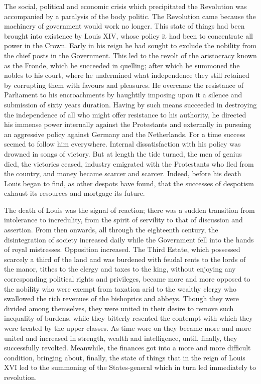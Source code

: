 \documentclass{book}
\begin{document}
The social, political and economic crisis which precipitated the Revolution was accompanied by a paralysis of the body politic. The Revolution came because the machinery of government would work no longer. This state of things had been brought into existence by Louis XIV, whose policy it had been to concentrate all power in the Crown. Early in his reign he had sought to exclude the nobility from the chief posts in the Government. This led to the revolt of the aristocracy known as the Fronde, which he succeeded in quelling; after which he summoned the nobles to his court, where he undermined what independence they still retained by corrupting them with favours and pleasures. He overcame the resistance of Parliament to his encroachments by haughtily imposing upon it a silence and submission of sixty years duration. Having by such means succeeded in destroying the independence of all who might offer resistance to his authority, he directed his immense power internally against the Protestants and externally in pursuing an aggressive policy against Germany and the Netherlands. For a time success seemed to follow him everywhere. Internal dissatisfaction with his policy was drowned in songs of victory. But at length the tide turned, the men of genius died, the victories ceased, industry emigrated with the Protestants who fled from the country, and money became scarcer and scarcer. Indeed, before his death Louis began to find, as other despots have found, that the successes of despotism exhaust its resources and mortgage its future.

The death of Louis was the signal of reaction; there was a sudden transition from intolerance to incredulity, from the spirit of servility to that of discussion and assertion. From then onwards, all through the eighteenth century, the disintegration of society increased daily while the Government fell into the hands of royal mistresses. Opposition increased. The Third Estate, which possessed scarcely a third of the land and was burdened with feudal rents to the lords of the manor, tithes to the clergy and taxes to the king, without enjoying any corresponding political rights and privileges, became more and more opposed to the nobility who were exempt from taxation arid to the wealthy clergy who swallowed the rich revenues of the bishoprics and abbeys. Though they were divided among themselves, they were united in their desire to remove such inequality of burdens, while they bitterly resented the contempt with which they were treated by the upper classes. As time wore on they became more and more united and increased in strength, wealth and intelligence, until, finally, they successfully revolted. Meanwhile, the finances got into a more and more difficult condition, bringing about, finally, the state of things that in the reign of Louis XVI led to the summoning of the States-general which in turn led immediately to revolution.
\end{document}
